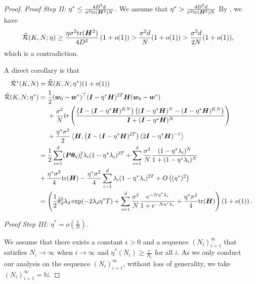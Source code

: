 \begin{proof}
    \textit{Proof Step II: $\eta^* \leq \frac{4D^2d}{\sigma^2\mathrm{tr}({\bm{H}}^2)N}$.} We assume that $\eta^*>\frac{4D^2d}{\sigma^2\mathrm{tr}({\bm{H}}^2)N}$ By , we have
    \begin{align*}
        \widehat{\mathcal{R}}(K, N;\eta)\geq\frac{\eta\sigma^2\mathrm{tr}({\bm{H}}^2)}{4D^2}\left(1 +o(1)\right)>\frac{\sigma^2d}{N}(1+o(1))>\frac{\sigma^2d}{2N}(1+o(1)),
    \end{align*}
    which is a contradiction.
    
    A direct corollary is that 
    \begin{align*}
        \Bar{\mathcal{R}}^*(K, N) &= \widehat{\mathcal{R}}(K, N;\eta^*)(1+o(1)) \\
        \widehat{\mathcal{R}}(K, N;\eta^*)&=\frac{1}{2}({\bm{w}}_0 - {\bm{w}}^*)^{\top} ({\bm{I}}-\eta^*{\bm{H}})^{2T}{\bm{H}} ({\bm{w}}_0 - {\bm{w}}^*)\\&~~~~+\frac{\sigma^2}{N} tr\left(\frac{\left({\bm{I}} -({\bm{I}} -\eta^*{\bm{H}})^{KN}\right)\left(({\bm{I}} -\eta^*{\bm{H}})^{N} -({\bm{I}} -\eta^*{\bm{H}})^{KN}\right)}{{\bm{I}} + ({\bm{I}} -\eta^*{\bm{H}})^N}\right) \\
        &~~~~+\frac{\eta^*\sigma^2}{2}\left\langle {\bm{H}},\left({\bm{I}} - ({\bm{I}} - \eta^* {\bm{H}})^{2T}\right)(2{\bm{I}}-\eta^*{\bm{H}})^{-1}\right\rangle \\
        &= \frac{1}{2} \sum_{i=1}^d ({\bm{P}}{\bm{\theta}}_{0})_l^2 \lambda_i (1-\eta^*\lambda_i)^{2T} +\sum_{i=1}^d\frac{\sigma^2}{N}\frac{(1-\eta^*\lambda_i)^N}{1+ (1-\eta^*\lambda_i)^N} \\
        &+ \frac{\eta^*\sigma^2}{4}\mathrm{tr}({\bm{H}})- \frac{\eta^*\sigma^2}{4}\sum_{i=1}^d\lambda_i(1-\eta^*\lambda_i)^{2T}+ O\left((\eta^*)^2\right)\\
        &=\left(\frac{1}{2}\Tilde{\theta}_d^2 \lambda_d \exp(-2\lambda_d \eta^* T)+ \sum_{i=1}^d\frac{\sigma^2}{N}\frac{e^{-N\eta^*\lambda_i}}{1+ e^{-N\eta^*\lambda_i}} + \frac{\eta^*\sigma^2}{4}\mathrm{tr}({\bm{H}})\right)\left(1 + o(1)\right).
    \end{align*}
    
    \textit{Proof Step III: $\eta^*=o\left(\frac{1}{N}\right)$.}
    
    We assume that there exists a constant $\epsilon>0$ and a sequence $(N_i)_{i=1}^{\infty}$ that satisfies $N_{i}\to\infty$ when $i\to\infty$ and $\eta^*(N_i)\geq\frac{\epsilon}{N_i}$ for all $i$. As we only conduct our analysis on the sequence $(N_i)_{i=1}^{\infty}$, without loss of generality, we take $(N_i)_{i=1}^{\infty} = \mathds{N}$.


\end{proof}
